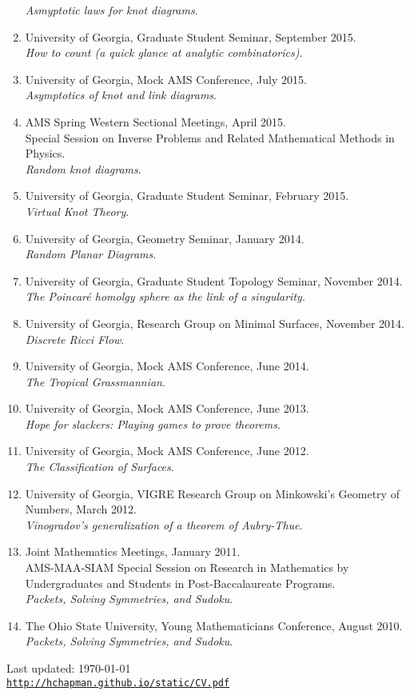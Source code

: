 \documentclass[letterpaper]{article}
\def\footerlink{http://hchapman.github.io/static/CV.pdf}
\begin{document}
\begin{enumerate}
  \textit{Asmyptotic laws for knot diagrams}.
\item University of Georgia, Graduate Student Seminar, September 2015.\\
  \textit{How to count (a quick glance at analytic combinatorics)}.
\item University of Georgia, Mock AMS Conference, July 2015.\\
  \textit{Asymptotics of knot and link diagrams}.
\item AMS Spring Western Sectional Meetings, April 2015.\\
  Special Session on Inverse Problems and Related Mathematical Methods in Physics. \\
  \textit{Random knot diagrams}.
\item University of Georgia, Graduate Student Seminar, February
  2015.\\
  \textit{Virtual Knot Theory}.
\item University of Georgia, Geometry Seminar, January 2014.\\
  \textit{Random Planar Diagrams}.
\item University of Georgia, Graduate Student Topology Seminar,
  November 2014.\\
  \textit{The Poincar\'e homolgy sphere as the link of a singularity}.
\item University of Georgia, Research Group on
  Minimal Surfaces, November 2014.\\
  \textit{Discrete Ricci Flow}.
\item University of Georgia, Mock AMS Conference, June 2014.\\
  \textit{The Tropical Grassmannian}.
\item University of Georgia, Mock AMS Conference, June 2013.\\
  \textit{Hope for slackers: Playing games to prove theorems}.
\item University of Georgia, Mock AMS Conference, June 2012.\\
  \textit{The Classification of Surfaces}.
\item University of Georgia, VIGRE Research Group on Minkowski's
  Geometry of Numbers, March 2012.\\
  \textit{Vinogradov's generalization of a theorem of Aubry-Thue}.
\item Joint Mathematics Meetings, January 2011.\\
  AMS-MAA-SIAM Special Session on Research in Mathematics by
  Undergraduates and Students in Post-Baccalaureate Programs.\\
  \textit{Packets, Solving Symmetries, and Sudoku}.
\item The Ohio State University, Young Mathematicians Conference,
  August 2010.\\
  \textit{Packets, Solving Symmetries, and Sudoku}.
\end{enumerate}

\bigskip

\begin{center}
  \begin{footnotesize}
    Last updated: \today \\
    \href{\footerlink}{\texttt{\footerlink}}
  \end{footnotesize}
\end{center}
\end{document}
